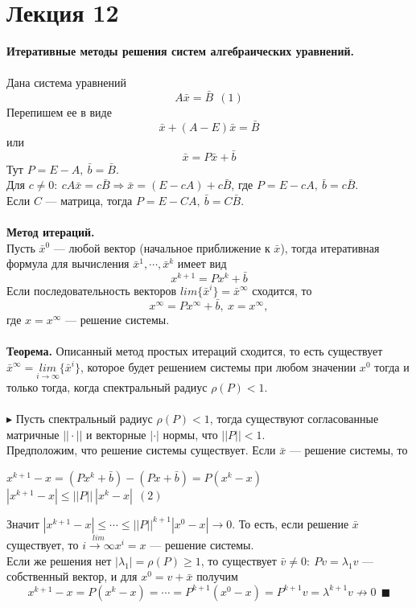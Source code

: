 \documentclass[12pt]{article}
\theoremstyle{definition}
\numberwithin{equation}{section}
\begin{document}
\section *{Лекция 12}
\noindent\textbf{Итеративные методы решения систем алгебраических уравнений.}\\ \\
Дана система уравнений $$A\bar x=\bar B~~(1)$$
Перепишем ее в виде $$\bar x+(A-E)\bar x=\bar B$$
или $$\bar x=P\bar x+\bar b$$
Тут $P=E-A,~\bar b=\bar B$.\\
Для $c\neq 0:~cA\bar x=c\bar B \Rightarrow \bar x=(E-cA)+c\bar B$, где $P=E-cA,~\bar b=c\bar B$.\\
Если $C$ --- матрица, тогда $P=E-CA,~\bar b=C\bar B$.\\ \\
\textbf{Метод итераций.}\\
Пусть $\bar x^0$ --- любой вектор (начальное приближение к $\bar x$), тогда итеративная формула для вычисления $\bar x^1, \cdots, \bar x^k$ имеет вид
$$x^{k+1}=Px^k+\bar b$$ 
Если последовательность векторов $lim\{\bar x^i\}=\bar x^{\infty}$ сходится, то $$x^{\infty}=Px^{\infty}+\bar b,~x=x^{\infty},$$
где $x=x^{\infty}$ --- решение системы.\\
\\
\textbf{Теорема.} Описанный метод простых итераций сходится, то есть существует $\bar x^{\infty}=\underset{i\to \infty}{lim}\{\bar x^i\}$, которое будет решением системы при любом значении $x^0$ тогда и только тогда, когда спектральный радиус $\rho(P)<1$.\\ \\
$\blacktriangleright$ Пусть спектральный радиус $\rho(P)<1$, тогда существуют согласованные матричные $||\cdot||$ и векторные $|\cdot|$ нормы, что $||P||<1$.\\
Предположим, что решение системы существует. Если $\bar x$ --- решение системы, то \begin{center}
$x^{k+1}-x=(Px^k+\bar b)-(Px+\bar b)=P(x^k-x)$\\
$|x^{k+1}-x|\leqslant||P||~|x^k-x|~~(2)$
\end{center}
Значит $|x^{k+1}-x|\leqslant \cdots \leqslant ||P||^{k+1}|x^0-x| \to 0$. То есть, если решение $\bar x$ существует, то $\overset{lim}{i\to \infty}x^i=x$ --- решение системы.\\
Если же решения нет $|\lambda_1|=\rho(P)\geqslant 1$, то существует $\bar v\neq 0:~Pv=\lambda_1 v$ --- собственный вектор, и для $x^0=v+\bar x$ получим
$$x^{k+1}-x=P(x^k-x)=\cdots=P^{k+1}(x^0-x)=P^{k+1}v=\lambda^{k+1}v \nrightarrow 0~~\blacksquare$$
\end{document}
